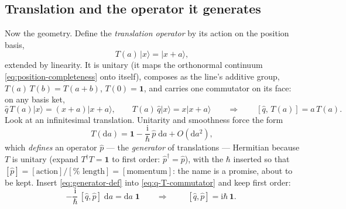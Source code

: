 \documentclass[11pt]{article}
\theoremstyle{plain}
\theoremstyle{definition}
\theoremstyle{remark}
\newcommand{\dd}{\mathrm{d}}
\newcommand{\ii}{\mathrm{i}}
\newcommand{\op}[1]{\hat{#1}}
\newcommand{\idop}{\mathbf{1}}  %
\newcommand{\ket}[1]{\lvert #1 \rangle}
\begin{document}
\subsection{Translation and the operator it generates}
\label{sec:translation}

Now the geometry. Define the \emph{translation operator} by its
action on the position basis,
\begin{equation}
  T(a)\,\ket x = \ket{x + a},
\end{equation}
extended by linearity. It is unitary (it maps the orthonormal
continuum \eqref{eq:position-completeness} onto itself), composes as
the line's additive group, $T(a)\,T(b) = T(a + b)$, $T(0) = \idop$,
and carries one commutator on its face: on any basis ket,
\begin{equation}
  \op q\,T(a)\ket x = (x + a)\ket{x+a},
  \qquad
  T(a)\,\op q\ket x = x\ket{x+a}
  \qquad\Longrightarrow\qquad
  [\op q,\, T(a)] = a\,T(a) .
  \label{eq:q-T-commutator}
\end{equation}
Look at an infinitesimal translation. Unitarity and smoothness force
the form
\begin{equation}
  T(\dd a)
  = \idop - \frac{\ii}{\hbar}\,\op p\;\dd a + O(\dd a^2),
  \label{eq:generator-def}
\end{equation}
which \emph{defines} an operator $\op p$ --- the \emph{generator} of
translations --- Hermitian because $T$ is unitary (expand
$T^\dagger T = \idop$ to first order: $\op p^\dagger = \op p$), with
the $\hbar$ inserted so that $[\op p] = [\text{action}]/[\text{%
length}] = [\text{momentum}]$: the name is a promise, about
to be kept. Insert \eqref{eq:generator-def} into
\eqref{eq:q-T-commutator} and keep first order:
\begin{equation}
  -\frac{\ii}{\hbar}\,[\op q, \op p]\;\dd a
  = \dd a\;\idop
  \qquad\Longrightarrow\qquad
  \boxed{\;
  [\op q, \op p] = \ii\hbar\,\idop .
  \;}
  \label{eq:CCR-derived}
\end{equation}
\end{document}
